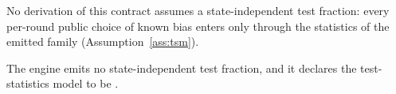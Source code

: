 
No derivation of this contract assumes a state-independent test fraction:
every per-round public choice of known bias enters only through the
statistics of the emitted family (Assumption~\ref{ass:tsm}).

\begin{requirement}\label{req:output-state-statistics}
The engine emits no state-independent test fraction, and it declares the
test-statistics model  to be
.
\end{requirement}
